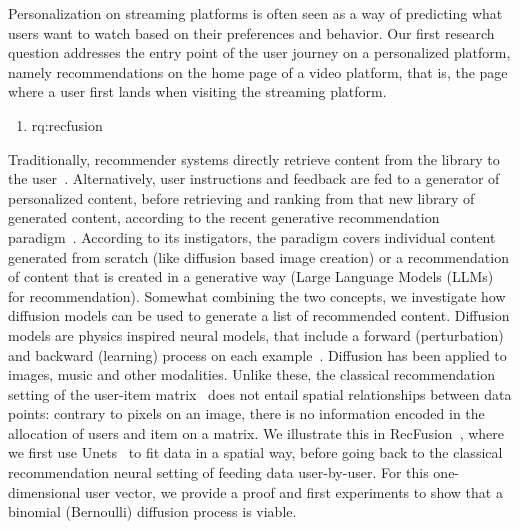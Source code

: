 Personalization on streaming platforms is often seen as a way of predicting what users want to watch based on their preferences and behavior.
Our first research question addresses the entry point of the user journey on a personalized platform, namely recommendations on the home page of a video platform, that is, the page where a user first lands when visiting the  streaming platform.
%
\begin{enumerate}[label=\textbf{RQ\arabic*},ref={RQ\arabic*},resume,leftmargin=*]
	\item \acl{rq:recfusion}\label{rq:recfusion}
\end{enumerate}
%
Traditionally, recommender systems directly retrieve content from the library to the user~\cite{firstReco}. 
Alternatively, user instructions and feedback are fed to a generator of personalized content, before retrieving and ranking from that new library of generated content, according to the recent generative recommendation paradigm~\cite{generativeReco}. According to its instigators, the paradigm covers individual content generated from scratch (like diffusion based image creation) or a recommendation of content that is created in a generative way (Large Language Models (LLMs) for recommendation). Somewhat combining the two concepts, we investigate how diffusion models can be used to generate a list of recommended content. Diffusion models are physics inspired neural models, that include a forward (perturbation) and backward (learning) process on each example~\cite{jascha}. Diffusion has been applied to images, music and other modalities. Unlike these, the classical recommendation setting of the user-item matrix~\cite{MF} does not entail spatial relationships between data points: contrary to pixels on an image, there is no information encoded in the allocation of users and item on a matrix. We illustrate this in RecFusion~\cite{recfusion}, where we first use Unets~\cite{unet} to fit data in a spatial way, before going back to the classical recommendation neural setting of feeding data user-by-user. For this one-dimensional user vector, we provide a proof and first experiments to show that a binomial (Bernoulli) diffusion process is viable.


